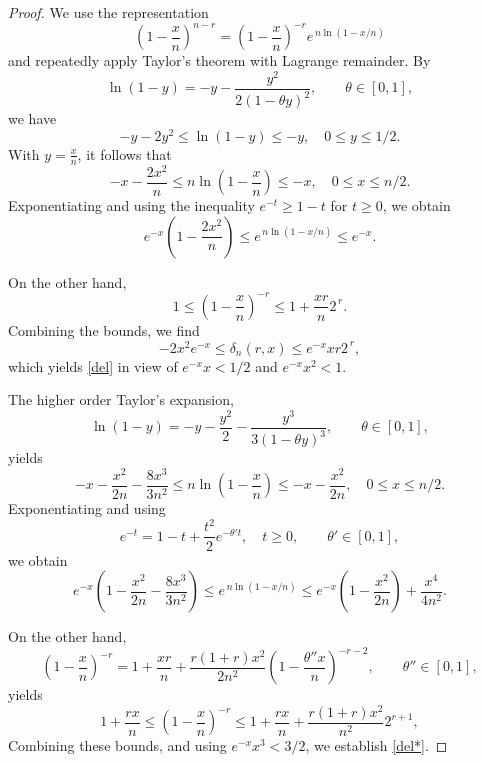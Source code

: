 \documentclass[10pt,a4paper]{amsart}
\begin{document}
\begin{proof}
We use the representation
\[
\left(1-\frac{x}{n}\right)^{n-r}
= \left(1-\frac{x}{n}\right)^{-r} e^{\,n\ln(1-x/n)}
\]
and repeatedly apply Taylor's theorem with Lagrange remainder. By
\[
\ln(1-y) = -y - \frac{y^2}{2(1-\theta y)^2}, \qquad \theta \in [0,1],
\]
we have
\[
-y - 2y^2\le \ln(1-y)\le -y,\quad 0\le y\le 1/2.
\]
With $y = \frac{x}{n}$, it follows that
\[
-x - \frac{2x^2}{n}
\le n\ln\left(1-\frac{x}{n}\right)
\le -x,\quad 0\le x\le n/2.
\]
Exponentiating and using the inequality $e^{-t} \ge 1 - t$ for $t \ge 0$, we obtain
\[
e^{-x}\left(1 - \frac{2x^2}{n}\right)
\le e^{\,n\ln(1-x/n)}
\le e^{-x}.
\]

On the other hand,\[
1 \le \left(1-\frac{x}{n}\right)^{-r}
\le 1 + \frac{xr}{n}2^{\,r}.
\]
Combining the bounds, we find
\[
-2x^2 e^{-x}
\le \delta_n(r,x)
\le e^{-x} x r 2^{\,r},
\]
which  yields \eqref{del} in view of $e^{-x}x<1/2$ and $e^{-x}x^2<1$.

The higher order Taylor's expansion,
\[
\ln(1-y) = -y - \frac{y^2}{2}- \frac{y^3}{3(1-\theta y)^3}, \qquad \theta \in [0,1],
\]
yields
\[
-x - \frac{x^2}{2n}- \frac{8x^3}{3n^2}
\le n\ln\left(1-\frac{x}{n}\right)
\le -x- \frac{x^2}{2n},\quad 0\le x\le n/2.
\]
Exponentiating and using 
\[e^{-t} = 1 - t+\frac{t^2}{2}e^{-\theta't},\quad t \ge 0, \qquad \theta' \in [0,1],\]
we obtain
\[
e^{-x}\left(1 - \frac{x^2}{2n}- \frac{8x^3}{3n^2}\right)
\le e^{\,n\ln(1-x/n)}
\le e^{-x}\left(1 - \frac{x^2}{2n}\right)+\frac{x^4}{4n^2}.
\]

On the other hand,
\[
 \left(1-\frac{x}{n}\right)^{-r}
= 1 + \frac{xr}{n}+\frac{r(1+r)x^2}{2n^2}\left(1-\frac{\theta''x}{n}\right)^{-r-2}, \qquad \theta'' \in [0,1],
\]
yields
\[
1 + \frac{rx}{n}\le \left(1-\frac{x}{n}\right)^{-r}
\le 1 + \frac{rx}{n}+\frac{r(1+r)x^2}{n^2}2^{r+1},
\]
Combining these bounds, and using $e^{-x}x^3<3/2$, we establish \eqref{del*}.
\end{proof}
\end{document}
